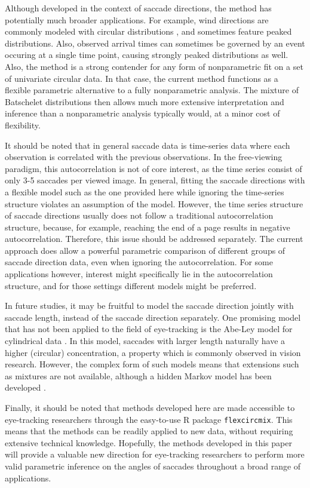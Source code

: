 Although developed in the context of saccade directions, the method has potentially much broader applications. For example, wind directions are commonly modeled with circular distributions \citep{bowers2000directional, holzmann2006hidden, bao2010bias}, and sometimes feature peaked distributions. Also, observed arrival times can sometimes be governed by an event occuring at a single time point, causing strongly peaked distributions as well. Also, the method is a strong contender for any form of nonparametric fit on a set of univariate circular data. In that case, the current method functions as a flexible parametric alternative to a fully nonparametric analysis. The mixture of Batschelet distributions then allows much more extensive interpretation and inference than a nonparametric analysis typically would, at a minor cost of flexibility.

It should be noted that in general saccade data is time-series data where each observation is correlated with the previous observations. In the free-viewing paradigm, this autocorrelation is not of core interest, as the time series consist of only 3-5 saccades per viewed image. In general, fitting the saccade directions with a flexible model such as the one provided here while ignoring the time-series structure violates an assumption of the model. However, the time series structure of saccade directions usually does not follow a traditional autocorrelation structure, because, for example, reaching the end of a page results in negative autocorrelation. Therefore, this issue should be addressed separately. The current approach does allow a powerful parametric comparison of different groups of saccade direction data, even when ignoring the autocorrelation. For some applications however, interest might specifically lie in the autocorrelation structure, and for those settings different models might be preferred.

In future studies, it may be fruitful to model the saccade direction jointly with saccade length, instead of the saccade direction separately. One promising model that has not been applied to the field of eye-tracking is the Abe-Ley model for cylindrical data \citep{abe2016tractable}. In this model, saccades with larger length naturally have a higher (circular) concentration, a property which is commonly observed in vision research. However, the complex form of such models means that extensions such as mixtures are not available, although a hidden Markov model has been developed \citep{lagona2015hidden}.

Finally, it should be noted that methods developed here are made accessible to eye-tracking researchers through the easy-to-use R package \texttt{flexcircmix}. This means that the methods can be readily applied to new data, without requiring extensive technical knowledge. Hopefully, the methods developed in this paper will provide a valuable new direction for eye-tracking researchers to perform more valid parametric inference on the angles of saccades throughout a broad range of applications.



